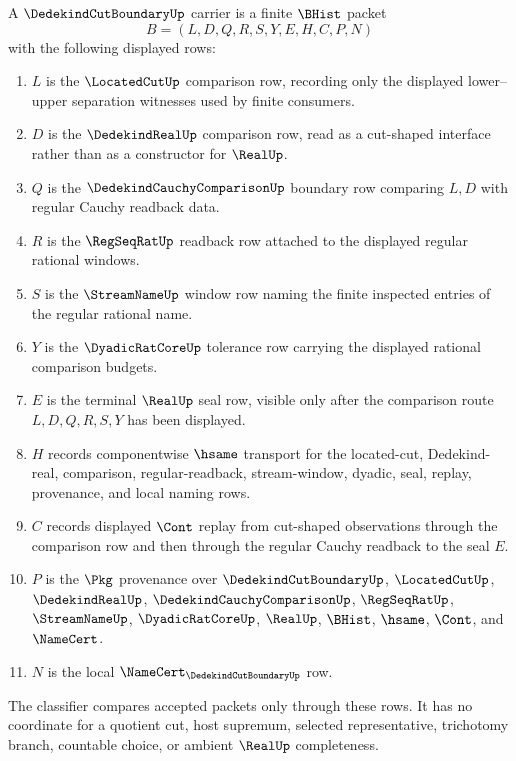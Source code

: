 \begin{definition}
\label{def:dedekind-cut-boundary-carrier}
A $\DedekindCutBoundaryUp$ carrier is a finite $\BHist$ packet
$$
B=(L,D,Q,R,S,Y,E,H,C,P,N)
$$
with the following displayed rows:
\begin{enumerate}
\item $L$ is the $\LocatedCutUp$ comparison row, recording only the displayed lower--upper separation witnesses used by finite consumers.
\item $D$ is the $\DedekindRealUp$ comparison row, read as a cut-shaped interface rather than as a constructor for $\RealUp$.
\item $Q$ is the $\DedekindCauchyComparisonUp$ boundary row comparing $L,D$ with regular Cauchy readback data.
\item $R$ is the $\RegSeqRatUp$ readback row attached to the displayed regular rational windows.
\item $S$ is the $\StreamNameUp$ window row naming the finite inspected entries of the regular rational name.
\item $Y$ is the $\DyadicRatCoreUp$ tolerance row carrying the displayed rational comparison budgets.
\item $E$ is the terminal $\RealUp$ seal row, visible only after the comparison route $L,D,Q,R,S,Y$ has been displayed.
\item $H$ records componentwise $\hsame$ transport for the located-cut, Dedekind-real, comparison, regular-readback, stream-window, dyadic, seal, replay, provenance, and local naming rows.
\item $C$ records displayed $\Cont$ replay from cut-shaped observations through the comparison row and then through the regular Cauchy readback to the seal $E$.
\item $P$ is the $\Pkg$ provenance over $\DedekindCutBoundaryUp$, $\LocatedCutUp$, $\DedekindRealUp$, $\DedekindCauchyComparisonUp$, $\RegSeqRatUp$, $\StreamNameUp$, $\DyadicRatCoreUp$, $\RealUp$, $\BHist$, $\hsame$, $\Cont$, and $\NameCert$.
\item $N$ is the local $\NameCert_{\DedekindCutBoundaryUp}$ row.
\end{enumerate}
The classifier compares accepted packets only through these rows. It has no coordinate for a quotient cut, host supremum, selected representative, trichotomy branch, countable choice, or ambient $\RealUp$ completeness.
\end{definition}

